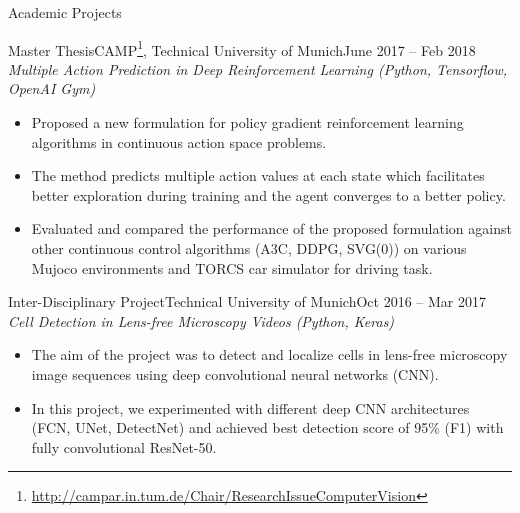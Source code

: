 \documentclass[]{mcdowellcv}
\begin{document}
    \makeheader
    
    \begin{cvsection}{Academic Projects}
    \begin{cvsubsection}[2]{Master Thesis}{CAMP\footnote{\href{http://campar.in.tum.de/Chair/ResearchIssueComputerVision}{http://campar.in.tum.de/Chair/ResearchIssueComputerVision}}, Technical University of Munich}{June 2017 -- Feb 2018}
    \textit{Multiple Action Prediction in Deep Reinforcement Learning (Python, Tensorflow, OpenAI Gym)}
        \begin{itemize}
            \item Proposed a new formulation for policy gradient reinforcement learning algorithms in continuous action space problems.
            \item The method predicts multiple action values at each state which facilitates better exploration during training and the agent converges to a better policy.
            \item Evaluated and compared the performance of the proposed formulation against other continuous control algorithms (A3C, DDPG, SVG(0)) on various Mujoco environments and TORCS car simulator for driving task.
        \end{itemize}
    \end{cvsubsection}
    
    \begin{cvsubsection}{Inter-Disciplinary Project}{Technical University of Munich}{Oct 2016 -- Mar 2017}
    \textit{Cell Detection in Lens-free Microscopy Videos (Python, Keras) \cite{rempfler-2017}}
        \begin{itemize}
        \item The aim of the project was to detect and localize cells in lens-free microscopy image sequences using deep convolutional neural networks (CNN).
        \item In this project, we experimented with different deep CNN architectures (FCN, UNet, DetectNet) and achieved best detection score of 95\% (F1) with fully convolutional ResNet-50.
        \end{itemize}
    \end{cvsubsection}
    
    \end{cvsection}
    
\end{document}
